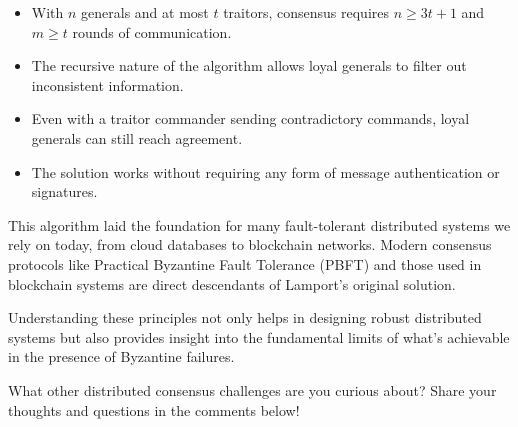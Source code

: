 \documentclass[11pt]{article}
\begin{document}
\begin{itemize}
    \item With $n$ generals and at most $t$ traitors, consensus requires $n \geq 3t+1$ and $m \geq t$ rounds of communication.
    \item The recursive nature of the algorithm allows loyal generals to filter out inconsistent information.
    \item Even with a traitor commander sending contradictory commands, loyal generals can still reach agreement.
    \item The solution works without requiring any form of message authentication or signatures.
\end{itemize}

This algorithm laid the foundation for many fault-tolerant distributed systems we rely on today, from cloud databases to blockchain networks. Modern consensus protocols like Practical Byzantine Fault Tolerance (PBFT) and those used in blockchain systems are direct descendants of Lamport's original solution.

Understanding these principles not only helps in designing robust distributed systems but also provides insight into the fundamental limits of what's achievable in the presence of Byzantine failures.

What other distributed consensus challenges are you curious about? Share your thoughts and questions in the comments below!
\end{document}
